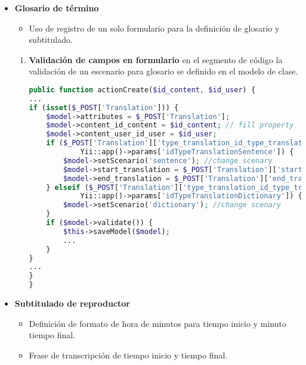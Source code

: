 \begin{itemize}

\item \textbf{Glosario de término}

\begin{itemize}

\item Uso de registro de un solo formulario para la definición de glosario y
subtitulado.

\end{itemize}

\begin{enumerate}

\item \textbf{Validación de campos en formulario} en el segmento de código
la validación de un escenario para glosario se definido en el modelo de clase.

\begin{lstlisting}[language=PHP, caption={Validación de campos para escenario glosario.}]
public function actionCreate($id_content, $id_user) {
...
if (isset($_POST['Translation'])) {
    $model->attributes = $_POST['Translation'];
    $model->content_id_content = $id_content; // fill property
    $model->content_user_id_user = $id_user;
    if ($_POST['Translation']['type_translation_id_type_translation'] == 
            Yii::app()->params['idTypeTranslationSentence']) {
        $model->setScenario('sentence'); //change scenary
        $model->start_translation = $_POST['Translation']['start_translation'];
        $model->end_translation = $_POST['Translation']['end_translation'];
    } elseif ($_POST['Translation']['type_translation_id_type_translation'] == 
            Yii::app()->params['idTypeTranslationDictionary']) {
        $model->setScenario('dictionary'); //change scenary
    }
    if ($model->validate()) {
        $this->saveModel($model);
        ...
    }
}
...
}
}
\end{lstlisting}

\end{enumerate}

\item \textbf{Subtitulado de reproductor}

\begin{itemize}

\item Definición de formato de hora de minutos para tiempo inicio y
minuto tiempo final.
\item Frase de transcripción de tiempo inicio y tiempo final.


\end{itemize}
\end{itemize}

